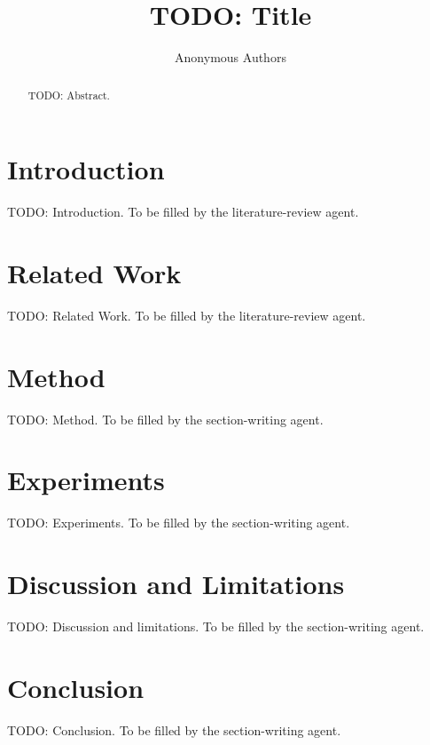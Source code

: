 \documentclass{article}
\title{TODO: Title}
\author{Anonymous Authors}
\date{}
\begin{document}
\maketitle

\begin{abstract}
TODO: Abstract.
\end{abstract}

\section{Introduction}
TODO: Introduction. To be filled by the literature-review agent.

\section{Related Work}
TODO: Related Work. To be filled by the literature-review agent.

\section{Method}
TODO: Method. To be filled by the section-writing agent.

\section{Experiments}
TODO: Experiments. To be filled by the section-writing agent.

\section{Discussion and Limitations}
TODO: Discussion and limitations. To be filled by the section-writing agent.

\section{Conclusion}
TODO: Conclusion. To be filled by the section-writing agent.



\end{document}
